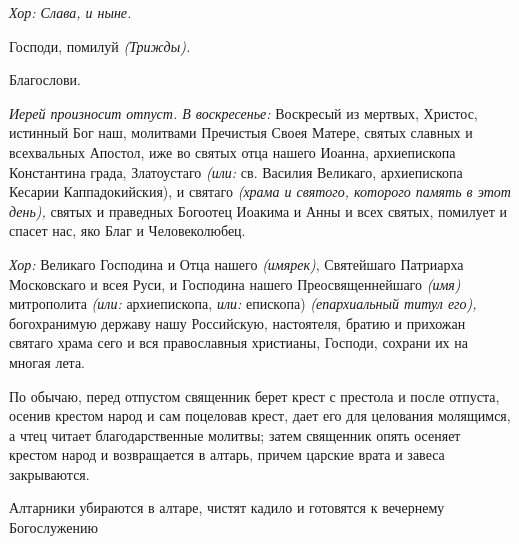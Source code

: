 \begin{mymulticols}
{\itshape Хор: Слава, и ныне.}

Господи, помилуй {\itshape (Трижды).}

Благослови. 


{\itshape Иерей произносит отпуст. В воскресенье:} Воскресый из мертвых, Христос, истинный Бог наш, молитвами Пречистыя Своея Матере, святых славных и всехвальных Апостол, иже во святых отца нашего Иоанна, архиепископа Константина града, Златоустаго {\itshape (или:} св. Василия Великаго, архиепископа Кесарии Каппадокийския), и святаго {\itshape (храма и святого, которого память в этот день),} святых и праведных Богоотец Иоакима и Анны и всех святых, помилует и спасет нас, яко Благ и Человеколюбец.


{\itshape Хор:} Великаго Господина и Отца нашего {\itshape (имярек)}, Святейшаго Патриарха Московскаго и всея Руси, и Господина нашего Преосвященнейшаго {\itshape (имя)} митрополита {\itshape (или:} архиепископа, {\itshape или:} епископа) {\itshape (епархиальный титул его),} богохранимую державу нашу Российскую, настоятеля, братию и прихожан святаго храма сего и вся православныя христианы, Господи, сохрани их на многая лета.

По обычаю, перед отпустом священник берет крест с престола и после отпуста, осенив крестом народ и сам поцеловав крест, дает его для целования молящимся, а чтец читает благодарственные молитвы; затем священник опять осеняет крестом народ и возвращается в алтарь, причем царские врата и завеса закрываются.

Алтарники убираются в алтаре, чистят кадило и готовятся к вечернему Богослужению

\end{mymulticols}

\mychapterending

